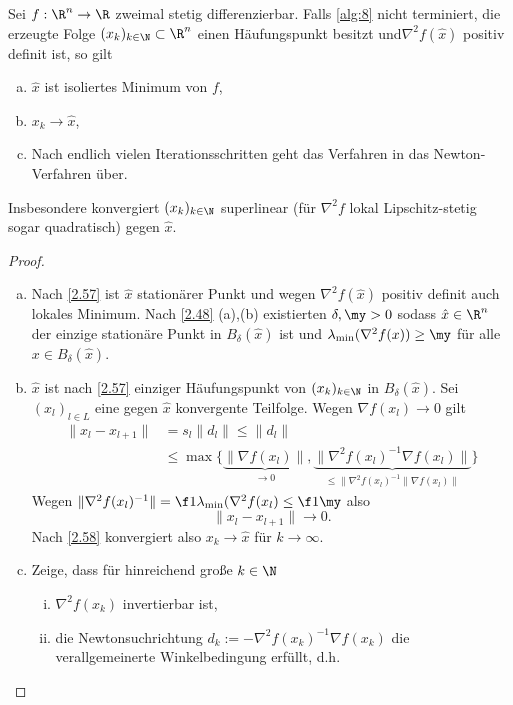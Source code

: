 \begin{st} \label{2.59}
	Sei $f: \R^n \to \R$ zweimal stetig differenzierbar.
	Falls \ref{alg:8} nicht terminiert, die erzeugte Folge $(x_k)_{k\in\N} \subset \R^n$ einen Häufungspunkt besitzt und$\nabla^2 f(\hat x)$ positiv definit ist, so gilt
	\begin{enumerate}[(a)]
		\item
			$\hat x$ ist isoliertes Minimum von $f$,
		\item
			$x_k \to \hat x$,
		\item
			Nach endlich vielen Iterationsschritten geht das Verfahren in das Newton-Verfahren über.
	\end{enumerate}
	Insbesondere konvergiert $(x_k)_{k\in \N}$ superlinear (für $\nabla^2 f$ lokal Lipschitz-stetig sogar quadratisch) gegen $\hat x$.
	\begin{proof}
		\begin{enumerate}[(a)]
			\item
				Nach \ref{2.57} ist $\hat x$ stationärer Punkt und wegen $\nabla^2 f(\hat x)$ positiv definit auch lokales Minimum.
				Nach \ref{2.48} (a),(b) existierten $\delta, \my > 0$ sodass $\hat x \in \R^n$ der einzige stationäre Punkt in $B_\delta(\hat x)$ ist und $\lambda_{\text{min}} (\nabla^2 f(x)) \ge \my$ für alle $x \in B_\delta(\hat x)$.
			\item
				$\hat x$ ist nach \ref{2.57} einziger Häufungspunkt von $(x_k)_{k\in\N}$ in $B_\delta(\hat x)$.
				Sei $(x_l)_{l\in L}$ eine gegen $\hat x$ konvergente Teilfolge.
				Wegen $\nabla f(x_l)  \to 0$ gilt
				\begin{align*}
					\|x_l - x_{l+1}\|
					&= s_l \|d_l\|
					\le \|d_l\| \\
					&\le \max \Big\{ \underbrace{\|\nabla f(x_l)\|}_{\to 0}, \underbrace{\|\nabla^2 f(x_l)^{-1} \nabla f(x_l)\|}_{\le \|\nabla^2 f(x_l)^{-1} \|\nabla f(x_l)\|} \Big\}
				\end{align*}
				Wegen $\|\nabla^2 f(x_l)^{-1}\| = \f 1{\lambda_{\text{min}}(\nabla^2 f(x_l)} \le \f 1\my$ also
				\[
					\|x_l - x_{l+1}\| \to 0.
				\]
				Nach \ref{2.58} konvergiert also $x_k \to \hat x$ für $k\to \infty$.
			\item
				Zeige, dass für hinreichend große $k \in \N$
				\begin{enumerate}[(i)]
					\item
						$\nabla^2 f(x_k)$ invertierbar ist,
					\item
						die Newtonsuchrichtung $d_k := - \nabla^2 f(x_k)^{-1} \nabla f(x_k)$ die verallgemeinerte Winkelbedingung erfüllt, d.h.

\end{enumerate}
\end{enumerate}
\end{proof}
\end{st}
